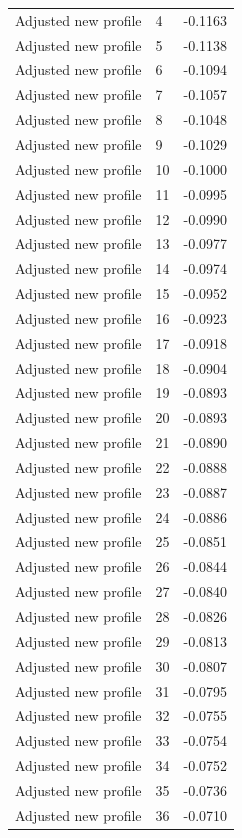 \begin{table}[htbp]
\begin{tabular}{lll}
Adjusted new profile & 4 & -0.1163 \\
Adjusted new profile & 5 & -0.1138 \\
Adjusted new profile & 6 & -0.1094 \\
Adjusted new profile & 7 & -0.1057 \\
Adjusted new profile & 8 & -0.1048 \\
Adjusted new profile & 9 & -0.1029 \\
Adjusted new profile & 10 & -0.1000 \\
Adjusted new profile & 11 & -0.0995 \\
Adjusted new profile & 12 & -0.0990 \\
Adjusted new profile & 13 & -0.0977 \\
Adjusted new profile & 14 & -0.0974 \\
Adjusted new profile & 15 & -0.0952 \\
Adjusted new profile & 16 & -0.0923 \\
Adjusted new profile & 17 & -0.0918 \\
Adjusted new profile & 18 & -0.0904 \\
Adjusted new profile & 19 & -0.0893 \\
Adjusted new profile & 20 & -0.0893 \\
Adjusted new profile & 21 & -0.0890 \\
Adjusted new profile & 22 & -0.0888 \\
Adjusted new profile & 23 & -0.0887 \\
Adjusted new profile & 24 & -0.0886 \\
Adjusted new profile & 25 & -0.0851 \\
Adjusted new profile & 26 & -0.0844 \\
Adjusted new profile & 27 & -0.0840 \\
Adjusted new profile & 28 & -0.0826 \\
Adjusted new profile & 29 & -0.0813 \\
Adjusted new profile & 30 & -0.0807 \\
Adjusted new profile & 31 & -0.0795 \\
Adjusted new profile & 32 & -0.0755 \\
Adjusted new profile & 33 & -0.0754 \\
Adjusted new profile & 34 & -0.0752 \\
Adjusted new profile & 35 & -0.0736 \\
Adjusted new profile & 36 & -0.0710 \\

\end{tabular}
\end{table}
